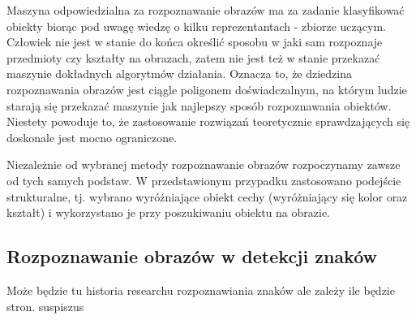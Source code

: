 Maszyna odpowiedzialna za rozpoznawanie obrazów ma za zadanie klasyfikować obiekty biorąc pod uwagę wiedzę o kilku reprezentantach - zbiorze uczącym. Człowiek nie jest w stanie do końca określić sposobu w jaki sam rozpoznaje przedmioty czy kształty na obrazach, zatem nie jest też w stanie przekazać maszynie dokładnych algorytmów działania. Oznacza to, że dziedzina rozpoznawania obrazów jest ciągle poligonem doświadczalnym, na którym ludzie starają się przekazać maszynie jak najlepszy sposób rozpoznawania obiektów. Niestety powoduje to, że zastosowanie rozwiązań teoretycznie sprawdzających się doskonale jest mocno ograniczone.

Niezależnie od wybranej metody rozpoznawanie obrazów rozpoczynamy zawsze od tych samych podstaw. W przedstawionym przypadku zastosowano podejście strukturalne, tj. wybrano wyróżniające obiekt cechy (wyróżniający się kolor oraz kształt) i wykorzystano je przy poszukiwaniu obiektu na obrazie.

\subsection{Rozpoznawanie obrazów w detekcji znaków}

Może będzie tu historia researchu rozpoznawiania znaków ale zależy ile będzie stron. suspiszus

